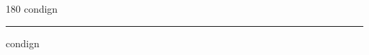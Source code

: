 
\begin{frame}
\begin{center}
\begin{turn}{180}
{\fontsize{2.5cm}{1em}\selectfont condign}
\end{turn}
\vspace{1em}\par  
\hrule
\vspace{1em}\par  
{\fontsize{2.5cm}{1em}\selectfont condign}
\end{center}
\end{frame}
